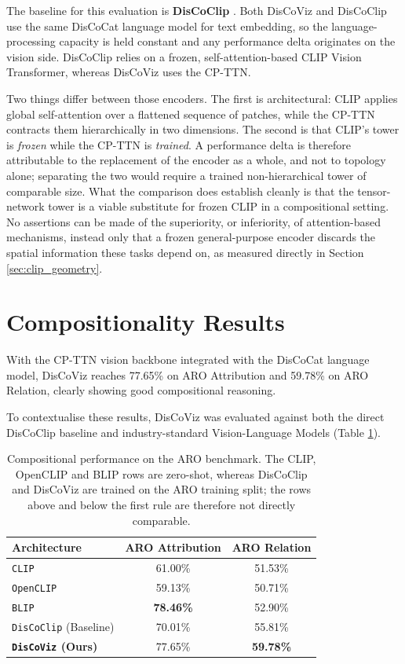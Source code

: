 \documentclass[12pt, a4paper, oneside]{report}
\begin{document}
The baseline for this evaluation is \textbf{DisCoClip} \cite{discoclip}. Both DisCoViz and DisCoClip use the same DisCoCat language model for text embedding, so the language-processing capacity is held constant and any performance delta originates on the vision side. DisCoClip relies on a frozen, self-attention-based CLIP Vision Transformer, whereas DisCoViz uses the CP-TTN.

Two things differ between those encoders. The first is architectural: CLIP applies global self-attention over a flattened sequence of patches, while the CP-TTN contracts them hierarchically in two dimensions. The second is that CLIP's tower is \textit{frozen} while the CP-TTN is \textit{trained}. A performance delta is therefore attributable to the replacement of the encoder as a whole, and not to topology alone; separating the two would require a trained non-hierarchical tower of comparable size. What the comparison does establish cleanly is that the tensor-network tower is a viable substitute for frozen CLIP in a compositional setting. No assertions can be made of the superiority, or inferiority, of attention-based mechanisms, instead only that a frozen general-purpose encoder discards the spatial information these tasks depend on, as measured directly in Section \ref{sec:clip_geometry}.

\section{Compositionality Results}

With the CP-TTN vision backbone integrated with the DisCoCat language model, DisCoViz reaches 77.65\% on ARO Attribution and 59.78\% on ARO Relation, clearly showing good compositional reasoning.

To contextualise these results, DisCoViz was evaluated against both the direct DisCoClip baseline and industry-standard Vision-Language Models (Table \ref{tab:aro_results}).

\begin{table}[hbt!]
    \centering
    \begin{tabular}{l c c}
        \toprule
        \textbf{Architecture} & \textbf{ARO Attribution} & \textbf{ARO Relation} \\
        \midrule
        \texttt{CLIP} \cite{radford2021learning} & 61.00\% & 51.53\% \\
        \texttt{OpenCLIP} & 59.13\% & 50.71\% \\
        \texttt{BLIP} & \textbf{78.46\%} & 52.90\% \\
        \midrule
        \texttt{DisCoClip} (Baseline) & 70.01\% & 55.81\% \\
        \textbf{\texttt{DisCoViz} (Ours)} & 77.65\% & \textbf{59.78\%} \\
        \bottomrule
    \end{tabular}
    \caption{Compositional performance on the ARO benchmark. The CLIP, OpenCLIP and BLIP rows are zero-shot, whereas DisCoClip and DisCoViz are trained on the ARO training split; the rows above and below the first rule are therefore not directly comparable.}
    \label{tab:aro_results}
\end{table}
\end{document}
